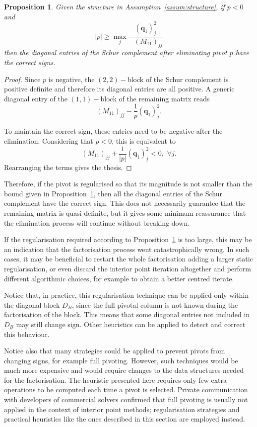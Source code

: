 \documentclass[a4paper]{article}
\newcommand{\qvec}{\mathbf q}
\newcommand{\0}{\mathbf 0}
\newtheorem{proposition}{Proposition}
\begin{document}
\begin{proposition}
\label{prop:regularise}
Given the structure in Assumption~\ref{assum:structure}, if $p<0$ and
\[
|p|\ge\max_j \frac{(\qvec_1)_j^2}{-(M_{11})_{jj}}
\]
then the diagonal entries of the Schur complement after eliminating pivot $p$ have the correct signs.
\end{proposition}
\begin{proof}
Since $p$ is negative, the $(2,2)-$block of the Schur complement is positive definite and therefore its diagonal entries are all positive. A generic diagonal entry of the $(1,1)-$block of the remaining matrix reads
\[(M_{11})_{jj} - \frac{1}{p}(\qvec_1)_j^2.\]

To maintain the correct sign, these entries need to be negative after the elimination. Considering that $p<0$, this is equivalent to
\[(M_{11})_{jj} + \frac{1}{|p|}(\qvec_1)_j^2<0, \,\,\forall j.\]
Rearranging the terms gives the thesis.
\end{proof}
Therefore, if the pivot is regularised so that its magnitude is not smaller than the bound given in Proposition~\ref{prop:regularise}, then all the diagonal entries of the Schur complement have the correct sign. This does not necessarily guarantee that the remaining matrix is quasi-definite, but it gives some minimum reassurance that the elimination process will continue without breaking down.

If the regularisation required according to Proposition~\ref{prop:regularise} is too large, this may be an indication that the factorisation process went catastrophically wrong. In such cases, it may be beneficial to restart the whole factorisation adding a larger static regularisation, or even discard the interior point iteration altogether and perform different algorithmic choices, for example to obtain a better centred iterate.

Notice that, in practice, this regularisation technique can be applied only within the diagonal block $D_B$, since the full pivotal column is not known during the factorisation of the block. This means that some diagonal entries not included in $D_B$ may still change sign. Other heuristics can be applied to detect and correct this behaviour. 

Notice also that many strategies could be applied to prevent pivots from changing signs, for example full pivoting. However, such techniques would be much more expensive and would require changes to the data structures needed for the factorisation. The heuristic presented here requires only few extra operations to be computed each time a pivot is selected. Private communication with developers of commercial solvers confirmed that full pivoting is usually not applied in the context of interior point methods; regularisation strategies and practical heuristics like the ones described in this section are employed instead.
\end{document}
